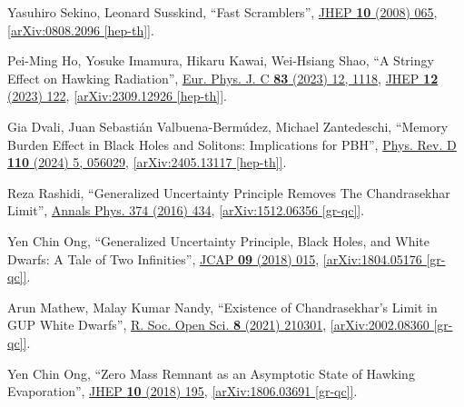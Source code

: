 \documentclass[12pt,preprintnumbers, floatfix, preprintnumbers, letterpaper, superscriptaddress,nofootinbib]{revtex4-2}
\begin{document}
\begin{thebibliography}{99}
Yasuhiro Sekino, Leonard Susskind, ``Fast Scramblers'', {\hypersetup{urlcolor=vividviolet}\href{https://iopscience.iop.org/article/10.1088/1126-6708/2008/10/065}{JHEP \textbf{10} (2008) 065}}, \href{https://arxiv.org/abs/0808.2096}{[arXiv:0808.2096 [hep-th]]}.

Pei-Ming Ho, Yosuke Imamura, Hikaru Kawai, Wei-Hsiang Shao, ``A Stringy Effect on Hawking Radiation'', {\hypersetup{urlcolor=vividviolet}\href{https://link.springer.com/article/10.1140/epjc/s10052-023-12302-3}{Eur. Phys. J. C \textbf{83} (2023) 12, 1118}}, {\hypersetup{urlcolor=vividviolet}\href{https://link.springer.com/article/10.1007/JHEP12(2023)122}{JHEP \textbf{12} (2023) 122}}, \href{https://arxiv.org/abs/2309.12926}{[arXiv:2309.12926 [hep-th]]}.

Gia Dvali, Juan Sebastián Valbuena-Bermúdez, Michael Zantedeschi, ``Memory Burden Effect in Black Holes and Solitons: Implications for PBH'', {\hypersetup{urlcolor=vividviolet}\href{https://journals.aps.org/prd/abstract/10.1103/PhysRevD.110.056029}{Phys. Rev. D \textbf{110} (2024) 5, 056029}}, \href{https://arxiv.org/abs/2405.13117}{[arXiv:2405.13117 [hep-th]]}.

Reza Rashidi, ``Generalized Uncertainty Principle Removes The Chandrasekhar Limit'', {\hypersetup{urlcolor=vividviolet}\href{https://linkinghub.elsevier.com/retrieve/pii/S0003491616301890}{Annals Phys. 374 (2016) 434}}, \href{https://arxiv.org/abs/1512.06356}{[arXiv:1512.06356 [gr-qc]]}.

Yen Chin Ong, ``Generalized Uncertainty Principle, Black Holes, and White Dwarfs: A Tale of Two Infinities'', {\hypersetup{urlcolor=vividviolet}\href{https://iopscience.iop.org/article/10.1088/1475-7516/2018/09/015}{JCAP \textbf{09} (2018) 015}}, \href{https://arxiv.org/abs/1804.05176}{[arXiv:1804.05176 [gr-qc]]}.

Arun Mathew, Malay Kumar Nandy, ``Existence of Chandrasekhar’s Limit in GUP White Dwarfs'', {\hypersetup{urlcolor=vividviolet}\href{https://royalsocietypublishing.org/doi/10.1098/rsos.210301}{R. Soc. Open Sci. \textbf{8} (2021) 210301}},  \href{https://arxiv.org/abs/2002.08360}{[arXiv:2002.08360 [gr-qc]]}.

Yen Chin Ong, ``Zero Mass Remnant as an Asymptotic State of Hawking Evaporation'', 	{\hypersetup{urlcolor=vividviolet}\href{https://link.springer.com/article/10.1007/JHEP10(2018)195}{JHEP \textbf{10} (2018) 195}}, \href{https://arxiv.org/abs/1806.03691}{[arXiv:1806.03691 [gr-qc]]}.


\end{thebibliography}
\end{document}
